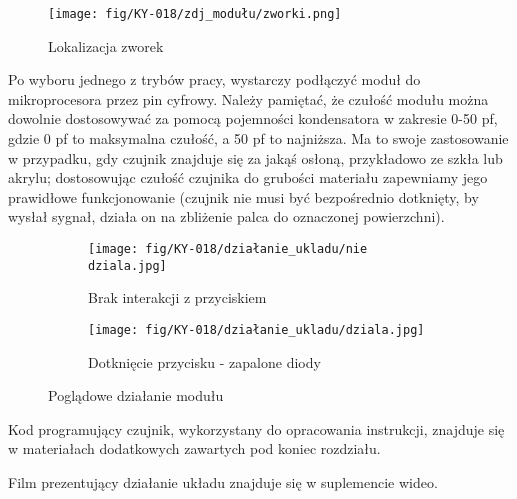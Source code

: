 \documentclass[11pt, a4paper]{article}
\begin{document}
\begin{figure}[h!]
  \centering
  \texttt{[image: fig/KY-018/zdj\_modułu/zworki.png]}
  \caption{Lokalizacja zworek}
  \label{fig:sub1}
\end{figure}
\vspace{0.5cm}
\begin{table}[h!]
\centering
{}
\caption{\label{tab:table-name}Opis trybów pracy modułu}
\end{table}
Po wyboru jednego z trybów pracy, wystarczy podłączyć moduł do mikroprocesora przez pin cyfrowy. Należy pamiętać, że czułość modułu można dowolnie dostosowywać za pomocą pojemności kondensatora w zakresie 0-50 pf, gdzie 0 pf to maksymalna czułość, a 50 pf to najniższa. Ma to swoje zastosowanie w przypadku, gdy czujnik znajduje się za jakąś osłoną, przykładowo ze szkła lub akrylu; dostosowując czułość czujnika do grubości materiału zapewniamy jego prawidłowe funkcjonowanie (czujnik nie musi być bezpośrednio dotknięty, by wysłał sygnał, działa on na zbliżenie palca do oznaczonej powierzchni). 


\begin{figure}[h!]
\centering
\begin{subfigure}{.5\textwidth}
  \centering
  \texttt{[image: fig/KY-018/działanie\_ukladu/nie dziala.jpg]}
  \caption{Brak interakcji z przyciskiem}
  \label{fig:sub1}
\end{subfigure}%
\begin{subfigure}{.5\textwidth}
  \centering
  \texttt{[image: fig/KY-018/działanie\_ukladu/dziala.jpg]}
  \caption{Dotknięcie przycisku - zapalone diody}
  \label{fig:sub2}
\end{subfigure}
\caption{Poglądowe działanie modułu}
\label{fig:test}
\end{figure}



\newpage

Kod programujący czujnik, wykorzystany do opracowania instrukcji, znajduje się w materiałach dodatkowych zawartych pod koniec rozdziału.
\newline

Film prezentujący działanie układu znajduje się w suplemencie wideo.

\printbibliography[heading=bibintoc]
\end{document}

